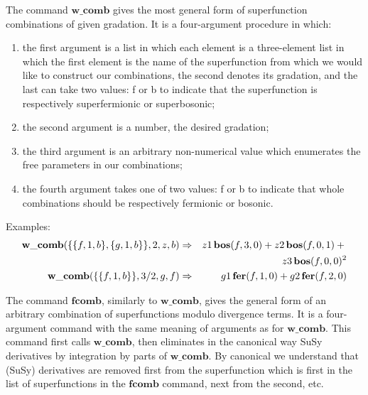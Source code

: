{The command $\mathbf{w\_comb}$ gives the most general form of
superfunction combinations of given gradation.  It is a four-argument
procedure in which:
\begin{enumerate}
\item the first argument is a list in which each element is a
  three-element list in which the first element is the name of the
  superfunction from which we would like to construct our combinations,
  the second denotes its gradation, and the last can take two values:
  f or b to indicate that the superfunction is respectively
  superfermionic or superbosonic;
\item the second argument is a number, the desired gradation;
\item the third argument is an arbitrary non-numerical value which
  enumerates the free parameters in our combinations;
\item the fourth argument takes one of two values: f or b to indicate
  that whole combinations should be respectively fermionic or bosonic.
\end{enumerate}

Examples:
\begin{eqnarray*}
  \mathbf{w\_comb}(\{\{ f,1,b \},\{g,1,b\}\},2,z,b) &\Rightarrow&
  z1\,\mathbf{bos}(f,3,0) + z2\,\mathbf{bos}(f,0,1) + \mbox{}\\
  && z3\,\mathbf{bos}(f,0,0)^2 \\
  \mathbf{w\_comb}(\{\{ f,1,b\}\},3/2,g,f) &\Rightarrow&
  g1\,\mathbf{fer}(f,1,0) + g2\,\mathbf{fer}(f,2,0)
\end{eqnarray*}

The command $\mathbf{fcomb}$, similarly to $\mathbf{w\_comb}$, gives
the general form of an arbitrary combination of superfunctions modulo
divergence terms.  It is a four-argument command with the same meaning
of arguments as for $\mathbf{w\_comb}$.  This command first calls
$\mathbf{w\_comb}$, then eliminates in the canonical way SuSy
derivatives by integration by parts of $\mathbf{w\_comb}$.  By
canonical we understand that (SuSy) derivatives are removed first from
the superfunction which is first in the list of superfunctions in the
$\mathbf{fcomb}$ command, next from the second, etc.

}
